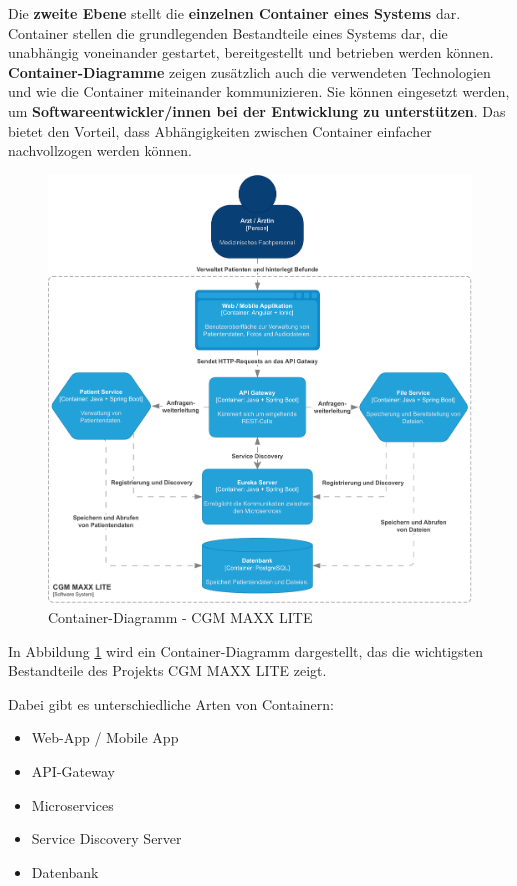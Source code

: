     \clearpage

    Die \textbf{zweite Ebene} stellt die \textbf{einzelnen Container eines Systems} dar. Container stellen die grundlegenden Bestandteile eines Systems dar, die unabhängig voneinander gestartet, bereitgestellt und betrieben werden können.
    \textbf{Container-Diagramme} zeigen zusätzlich auch die verwendeten Technologien und wie die Container miteinander kommunizieren. 
    Sie können eingesetzt werden, um \textbf{Softwareentwickler/innen bei der Entwicklung zu unterstützen}. Das bietet den Vorteil, dass Abhängigkeiten zwischen Container einfacher nachvollzogen werden können. 
    \cite{EA:Web28}
    
    \begin{figure}[H]
        \centering
        \includegraphics[scale=0.7]{pdf/EA/c4-container-diagram.pdf}
        \caption{Container-Diagramm - CGM MAXX LITE}
        \label{fig:c4-container-diagram}
    \end{figure}

    In Abbildung \ref{fig:c4-container-diagram} wird ein Container-Diagramm dargestellt, das die wichtigsten Bestandteile des Projekts CGM MAXX LITE zeigt. 
    
    Dabei gibt es unterschiedliche Arten von Containern:
    \begin{itemize}
        \item Web-App / Mobile App
        \item API-Gateway
        \item Microservices
        \item Service Discovery Server
        \item Datenbank
    \end{itemize}

